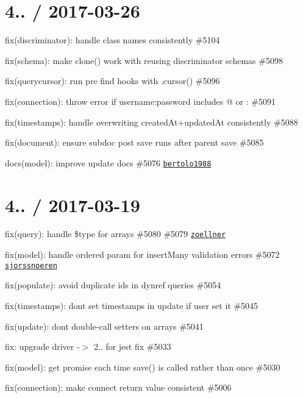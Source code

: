 \section*{4.. / 2017-\/03-\/26 }


\begin{DoxyItemize}
\item fix(discriminator)\+: handle class names consistently \#5104
\item fix(schema)\+: make clone() work with reusing discriminator schemas \#5098
\item fix(querycursor)\+: run pre find hooks with .cursor() \#5096
\item fix(connection)\+: throw error if username\+:password includes @ or \+: \#5091
\item fix(timestamps)\+: handle overwriting created\+At+updated\+At consistently \#5088
\item fix(document)\+: ensure subdoc post save runs after parent save \#5085
\item docs(model)\+: improve update docs \#5076 \href{https://github.com/bertolo1988}{\tt bertolo1988}
\end{DoxyItemize}

\section*{4.. / 2017-\/03-\/19 }


\begin{DoxyItemize}
\item fix(query)\+: handle \$type for arrays \#5080 \#5079 \href{https://github.com/zoellner}{\tt zoellner}
\item fix(model)\+: handle ordered param for {\ttfamily insert\+Many} validation errors \#5072 \href{https://github.com/sjorssnoeren}{\tt sjorssnoeren}
\item fix(populate)\+: avoid duplicate ids in dynref queries \#5054
\item fix(timestamps)\+: dont set timestamps in update if user set it \#5045
\item fix(update)\+: dont double-\/call setters on arrays \#5041
\item fix\+: upgrade driver -\/$>$ 2.. for jest fix \#5033
\item fix(model)\+: get promise each time save() is called rather than once \#5030
\item fix(connection)\+: make connect return value consistent \#5006
\end{DoxyItemize}

